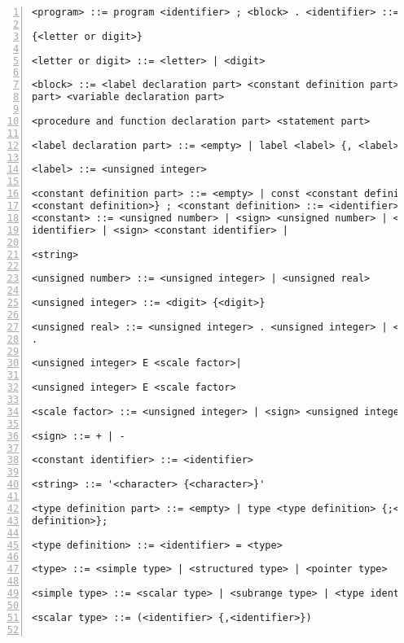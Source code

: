 
\renewcommand{\theFancyVerbLine}{%
{\small
ps.\arabic{FancyVerbLine}}}
 \begin{Verbatim}[numbers=left]
<program> ::= program <identifier> ; <block> . <identifier> ::= <letter >

{<letter or digit>}

<letter or digit> ::= <letter> | <digit>

<block> ::= <label declaration part> <constant definition part> <type definition
part> <variable declaration part>

<procedure and function declaration part> <statement part>

<label declaration part> ::= <empty> | label <label> {, <label>} ;

<label> ::= <unsigned integer>

<constant definition part> ::= <empty> | const <constant definition> { ;
<constant definition>} ; <constant definition> ::= <identifier> = <constant>
<constant> ::= <unsigned number> | <sign> <unsigned number> | <constant
identifier> | <sign> <constant identifier> |

<string>

<unsigned number> ::= <unsigned integer> | <unsigned real>

<unsigned integer> ::= <digit> {<digit>}

<unsigned real> ::= <unsigned integer> . <unsigned integer> | <unsigned integer>
. 

<unsigned integer> E <scale factor>|

<unsigned integer> E <scale factor>

<scale factor> ::= <unsigned integer> | <sign> <unsigned integer>

<sign> ::= + | -

<constant identifier> ::= <identifier>

<string> ::= '<character> {<character>}'

<type definition part> ::= <empty> | type <type definition> {;<type
definition>};

<type definition> ::= <identifier> = <type>

<type> ::= <simple type> | <structured type> | <pointer type>

<simple type> ::= <scalar type> | <subrange type> | <type identifier>

<scalar type> ::= (<identifier> {,<identifier>})


\end{Verbatim}
